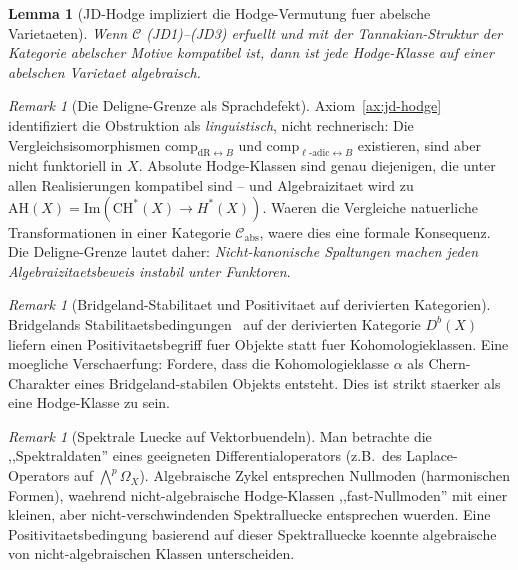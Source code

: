 \documentclass[aps,prd,twocolumn,superscriptaddress,nofootinbib]{revtex4-2}
\newtheorem{lemma}[theorem]{Lemma}
\theoremstyle{definition}
\theoremstyle{remark}
\newtheorem{remark}[theorem]{Remark}
\begin{document}
\begin{lemma}[JD-Hodge impliziert die Hodge-Vermutung fuer abelsche Varietaeten]\label{lem:jd-abelian}
Wenn $\mathcal{C}$ (JD1)--(JD3) erfuellt und mit der Tannakian-Struktur der Kategorie abelscher Motive kompatibel ist, dann ist jede Hodge-Klasse auf einer abelschen Varietaet algebraisch.
\end{lemma}

\begin{remark}[Die Deligne-Grenze als Sprachdefekt]\label{rem:deligne-language}
Axiom~\ref{ax:jd-hodge} identifiziert die Obstruktion als \emph{linguistisch}, nicht rechnerisch: Die Vergleichsisomorphismen $\mathrm{comp}_{\mathrm{dR} \leftrightarrow B}$ und $\mathrm{comp}_{\ell\text{-adic} \leftrightarrow B}$ existieren, sind aber nicht funktoriell in $X$. Absolute Hodge-Klassen sind genau diejenigen, die unter allen Realisierungen kompatibel sind -- und Algebraizitaet wird zu $\mathrm{AH}(X) = \mathrm{Im}(\mathrm{CH}^*(X) \to H^*(X))$. Waeren die Vergleiche natuerliche Transformationen in einer Kategorie $\mathcal{C}_{\mathrm{abs}}$, waere dies eine formale Konsequenz. Die Deligne-Grenze lautet daher: \emph{Nicht-kanonische Spaltungen machen jeden Algebraizitaetsbeweis instabil unter Funktoren}.
\end{remark}

\begin{remark}[Bridgeland-Stabilitaet und Positivitaet auf derivierten Kategorien]
\label{rem:bridgeland}
Bridgelands Stabilitaetsbedingungen~\cite{Bridgeland2007} auf der derivierten Kategorie $D^b(X)$ liefern einen Positivitaetsbegriff fuer Objekte statt fuer Kohomologieklassen. Eine moegliche Verschaerfung: Fordere, dass die Kohomologieklasse $\alpha$ als Chern-Charakter eines Bridgeland-stabilen Objekts entsteht. Dies ist strikt staerker als eine Hodge-Klasse zu sein.
\end{remark}

\begin{remark}[Spektrale Luecke auf Vektorbuendeln]
\label{rem:spectral-gap}
Man betrachte die ,,Spektraldaten'' eines geeigneten Differentialoperators (z.B.\ des Laplace-Operators auf $\bigwedge^p \Omega_X$). Algebraische Zykel entsprechen Nullmoden (harmonischen Formen), waehrend nicht-algebraische Hodge-Klassen ,,fast-Nullmoden'' mit einer kleinen, aber nicht-verschwindenden Spektralluecke entsprechen wuerden. Eine Positivitaetsbedingung basierend auf dieser Spektralluecke koennte algebraische von nicht-algebraischen Klassen unterscheiden.
\end{remark}
\end{document}
